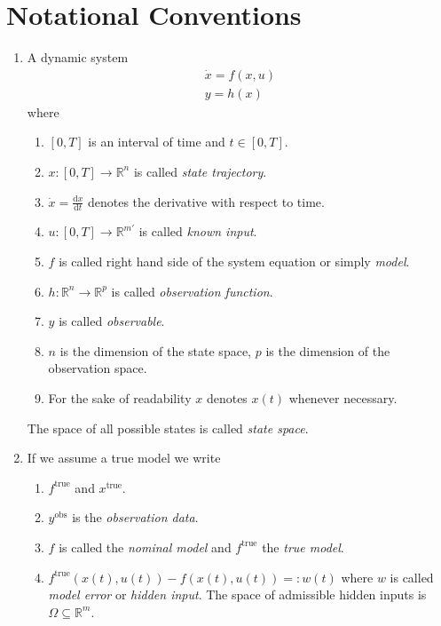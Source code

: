\section{Notational Conventions}
\begin{enumerate}
\item A dynamic system 
	\begin{equation}\begin{aligned}
	\dot{x} = f(x,u) \\
	y = h(x)
	\end{aligned}\end{equation}
	where
	\begin{enumerate}
	\item $[0,T]$ is an interval of time and $t\in[0,T]$. 
	\item $x:[0,T]\to \mathbb{R}^n$ is called \textit{state trajectory}.
	\item $\dot{x}=\frac{\text{d}x}{\text{d}t}$ denotes the derivative with respect to time.
	\item $u:[0,T]\to \mathbb{R}^{m'}$ is called \textit{known input}.
	\item $f$ is called right hand side of the system equation or simply \textit{model}.
	\item $h:\mathbb{R}^n\to \mathbb{R}^p$ is called \textit{observation function}.
	\item $y$ is called \textit{observable}.
	\item $n$ is the dimension of the state space, $p$ is the dimension of the observation 
		space.
	\item For the sake of readability $x$ denotes $x(t)$ whenever necessary.
	\end{enumerate}
	The space of all possible states is called \textit{state space}.
\item If we assume a true model we write 
	\begin{enumerate}
	\item	$f^\text{true}$ and $x^\text{true}$.
	\item	$y^\text{obs}$ is the \textit{observation data}.
	\item	$f$ is called the \textit{nominal model} and $f^\text{true}$ the \textit{true 
	model}.
	\item  $f^\text{true}(x(t),u(t))-f(x(t),u(t))=:w(t)$ where $w$ is called 
		\textit{model error} or \textit{hidden input}. The space of admissible hidden inputs 
		is $\Omega \subseteq \mathbb{R}^m$.
	\end{enumerate}
	

\end{enumerate}

